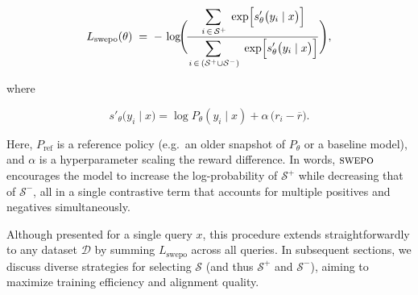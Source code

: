 \vspace{-0.15in}
\begin{equation}
L_{\text{swepo}}(\theta)
\;=\;
-\,\log\!\Biggl(\!
  \frac{
    \displaystyle
    \sum_{\,i \,\in\, \mathcal{S}^+}\;
    \exp\Bigl[
      s'_\theta\bigl(y_i \mid x\bigr)
    \Bigr]
  }{
    \displaystyle
    \sum_{\,i\,\in\,(\mathcal{S}^+\cup \mathcal{S}^-)}\;
    \exp\Bigl[
      s'_\theta\bigl(y_i \mid x\bigr)
    \Bigr]
  }
\Biggr),
\end{equation}

\vspace{-0.05in}
where

\vspace{-0.25in}
\[
s'_\theta\bigl(y_i \mid x\bigr)
  =
  \log P_\theta(y_i\mid x)
  +
  \alpha \,\bigl(r_i - \overline{r}\bigr).
\]

\vspace{-0.05in}
Here, \(P_{\mathrm{ref}}\) is a reference policy (e.g.\ an older snapshot of \(P_\theta\) or a baseline model), and \(\alpha\) is a hyperparameter scaling the reward difference. In words, \(\textsc{swepo}\) encourages the model to increase the log-probability of \(\mathcal{S}^+\) while decreasing that of \(\mathcal{S}^-\), all in a single contrastive term that accounts for multiple positives and negatives simultaneously.

Although presented for a single query \(x\), this procedure extends straightforwardly to any dataset \(\mathcal{D}\) by summing \(L_{\text{swepo}}\) across all queries. In subsequent sections, we discuss diverse strategies for selecting \(\mathcal{S}\) (and thus \(\mathcal{S}^+\) and \(\mathcal{S}^-\)), aiming to maximize training efficiency and alignment quality.



